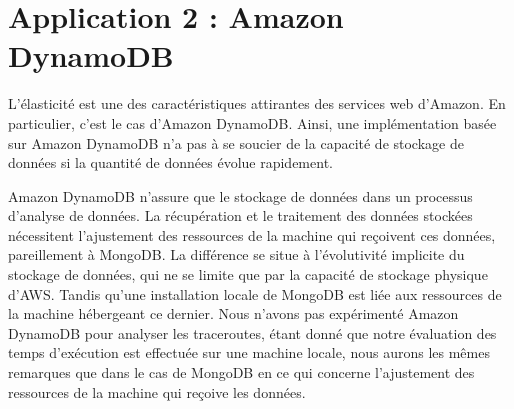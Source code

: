 
\section{Application 2 : Amazon DynamoDB}




L'élasticité est une des caractéristiques attirantes des services web d'Amazon. En particulier, c'est le cas d'Amazon DynamoDB. Ainsi, une implémentation basée sur Amazon DynamoDB  n'a pas à se soucier de la capacité  de stockage de données si la quantité de données évolue rapidement. 

 Amazon DynamoDB  n'assure que le stockage de données dans un processus d'analyse de données. La récupération et le traitement  des données stockées nécessitent l'ajustement des ressources de la machine qui reçoivent ces données, pareillement à MongoDB. La différence se situe à l'évolutivité implicite du stockage de données, qui ne se limite que par la capacité de stockage physique d'AWS. Tandis qu'une installation locale de MongoDB est liée aux ressources de la machine hébergeant ce dernier.  Nous n'avons pas expérimenté Amazon DynamoDB pour analyser les traceroutes, étant donné que notre évaluation des temps d'exécution est effectuée sur une machine locale, nous aurons les mêmes remarques que dans le cas de MongoDB en ce qui concerne l'ajustement des ressources de la machine qui reçoive les données.  
 
